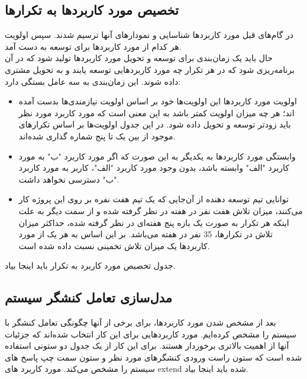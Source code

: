 \documentclass[12pt]{article}
\begin{document}
	\subsection{تخصیص مورد کاربردها به تکرارها}
	در گام‌های قبل مورد کاربردها شناسایی و نمودارهای آنها ترسیم شدند. سپس اولویت هر کدام از مورد کاربردها برای توسعه به دست آمد.\\
	حال باید یک زمان‌بندی برای توسعه و تحویل مورد کاربردها تولید شود که در آن برنامه‌ریزی شود که در هر تکرار چه مورد کاربردهایی توسعه یابند و به تحویل مشتری داده شوند.
	این زمان‌بندی به سه عامل بستگی دارد:
	\begin{itemize}
		\item اولویت مورد کاربردها
		این اولویت‌ها خود بر اساس اولویت نیازمندی‌ها بدست آمده اند؛ هر چه میزان اولویت کمتر باشد به این معنی است که مورد کاربرد مورد نظر باید زودتر توسعه و تحویل داده شود. در این جدول اولویت‌ها بر اساس تکرارهای موجود از بین یک تا پنج شماره گذاری شده‌اند.
		\item وابستگی مورد کاربردها به یکدیگر
		به این صورت که اگر مورد کاربرد "ب" به مورد کاربرد "الف" وابسته باشد، بدون وجود مورد کاربرد "الف"، کاربر به مورد کاربرد "ب" دسترسی نخواهد داشت.
		\item توانایی تیم توسعه دهنده
		از آن‌جایی که یک تیم هفت نفره بر روی این پروژه کار می‌کنند، میزان تلاش هفت نفر در هفته در نظر گرفته شده و از سمت دیگر به علت اینکه هر تکرار به صورت یک بازه‌ پنج هفته‌ای در نظر گرفته شده، حداکثر میزان تلاش در تکرارها، 35 نفر در هفته می‌باشد. بر این اساس به هر یک از مورد کاربردها یک میزان تلاش تخمینی نسبت داده شده است.
	\end{itemize}
جدول تخصیص مورد کاربرد به تکرار باید اینجا بیاد.


	\subsection{مدل‌سازی تعامل کنشگر سیستم}
	بعد از مشخص شدن مورد کاربردها، برای برخی از آنها چگونگی تعامل کنشگر با سیستم را مشخص کرده‌ایم. مورد کاربردهایی برای این کار انتخاب شده‌اند که جزئیات آنها از اهمیت بالاتری برخوردار هستند.
	برای این کار از یک جدول دو ستونی استفاده شده است که ستون راست ورودی کنشگرهای مورد نظر و ستون سمت چپ پاسخ های سیستم را مشخص می‌کند.
	مورد کاربرد های extend شده باید اینجا بیاد.

	\newpage
\end{document}
